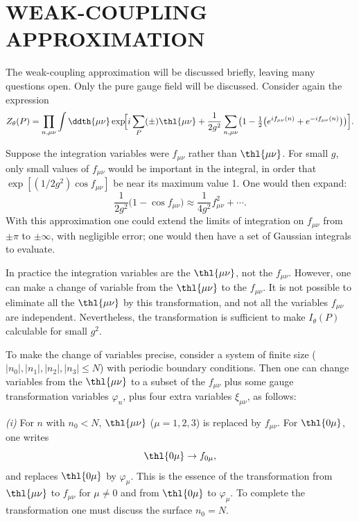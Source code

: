 \section{WEAK-COUPLING APPROXIMATION}\label{sec:weak}

The weak-coupling approximation will be discussed briefly, leaving many
questions open.  Only the pure gauge field will be discussed.  Consider
again the expression
\begin{equation}
Z_{\theta}(P) = \prod_{n,\mu\nu}\int\ddth{\mu\nu}
  \exp\!\Bigl[i\sum_{P}(\pm)\thl{\mu\nu}
    +\frac{1}{2g^{2}}\sum_{n,\mu\nu}
      \bigl(1-\tfrac{1}{2}\bigl(e^{if_{\mu\nu}(n)}+e^{-if_{\mu\nu}(n)}\bigr)\bigr)\Bigr].
\label{eq:5.1}
\end{equation}

Suppose the integration variables were $f_{\mu\nu}$ rather than
$\thl{\mu\nu}$.  For small $g$, only small values of $f_{\mu\nu}$ would
be important in the integral, in order that
$\exp[(1/2g^{2})\cos f_{\mu\nu}]$ be near its maximum value 1.  One
would then expand:
\begin{equation}
\frac{1}{2g^{2}}\bigl(1-\cos f_{\mu\nu}\bigr)
  \approx \frac{1}{4g^{2}}f_{\mu\nu}^{2}+\cdots .
\label{eq:5.2}
\end{equation}
With this approximation one could extend the limits of integration on
$f_{\mu\nu}$ from $\pm\pi$ to $\pm\infty$, with negligible error; one
would then have a set of Gaussian integrals to evaluate.

In practice the integration variables are the $\thl{\mu\nu}$, not the
$f_{\mu\nu}$.  However, one can make a change of variable from the
$\thl{\mu\nu}$ to the $f_{\mu\nu}$.  It is not possible to eliminate all
the $\thl{\mu\nu}$ by this transformation, and not all the variables
$f_{\mu\nu}$ are independent.  Nevertheless, the transformation is
sufficient to make $I_{\theta}(P)$ calculable for small $g^{2}$.

To make the change of variables precise, consider a system of finite
size ($|n_{0}|,|n_{1}|,|n_{2}|,|n_{3}| \le N$) with periodic boundary
conditions.  Then one can change variables from the $\thl{\mu\nu}$ to a
subset of the $f_{\mu\nu}$ plus some gauge transformation variables
$\varphi_{n}$, plus four extra variables $\xi_{\mu\nu}$, as follows:

\emph{(i)}  For $n$ with $n_{0} < N$, $\thl{\mu\nu}$
($\mu=1,2,3$) is replaced by $f_{\mu\nu}$.  For $\thl{0\mu}$, one writes
\begin{equation}
\thl{0\mu} \to f_{0\mu},
\label{eq:5.3}
\end{equation}
and replaces $\thl{0\mu}$ by $\varphi_{\mu}$.  This is the essence of the
transformation from $\thl{\mu\nu}$ to $f_{\mu\nu}$ for $\mu \ne 0$ and
from $\thl{0\mu}$ to $\varphi_{\mu}$.  To complete the transformation one
must discuss the surface $n_{0}=N$.

